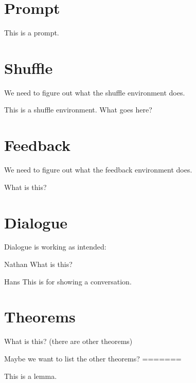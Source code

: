 \documentclass{ximera}
\begin{document}
\section{Prompt}

\begin{prompt}
This is a prompt.
\end{prompt}



\section{Shuffle}

We need to figure out what the shuffle environment does.

\begin{shuffle}
This is a shuffle environment. What goes here?
\end{shuffle}


\section{Feedback}

We need to figure out what the feedback environment does.

\begin{feedback}
What is this?
\end{feedback}

\section{Dialogue}

Dialogue is working as intended:

\begin{dialogue}
\item[Nathan] What is this?
\item[Hans] This is for showing a conversation.
\end{dialogue}

\section{Theorems}

\begin{theorem}
What is this? (there are other theorems)
\end{theorem}

Maybe we want to list the other theorems?
=======
\begin{lemma}
This is a lemma.
\end{lemma}
\end{document}
